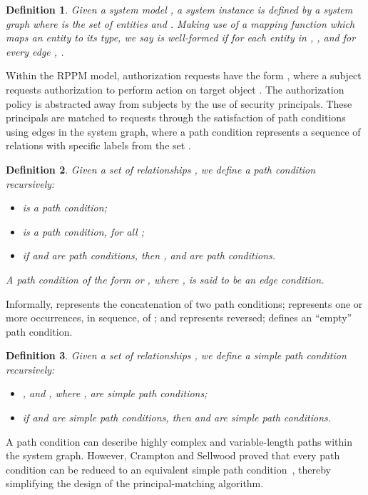 \documentclass{article}
\newtheorem{definition}{Definition}
\begin{document}
\begin{definition}
    Given a system model , a \emph{system instance} is defined by a \emph{system graph}  where  is the set of entities and .
    Making use of a mapping function  which maps an entity to its type, we say  is \emph{well-formed} if for each entity  in , , and for every edge , .
\end{definition}

Within the RPPM model, authorization requests have the form , where a subject  requests authorization to perform action  on target object .
The authorization policy is abstracted away from subjects by the use of security principals.
These principals are matched to requests through the satisfaction of path conditions using edges in the system graph, where a path condition  represents a sequence of relations with specific labels from the set .

\begin{definition}\label{def:path-condition}
   Given a set of relationships , we define a \emph{path condition} recursively:
    \begin{itemize}
        \item  is a path condition;
        \item  is a path condition, for all ;
        \item if  and  are path conditions, then ,  and  are path conditions.
    \end{itemize}
   A path condition of the form  or , where , is said to be an \emph{edge condition}.
\end{definition}

Informally,  represents the concatenation of two path conditions;  represents one or more occurrences, in sequence, of ; and  represents  reversed;  defines an ``empty'' path condition.

\begin{definition}
   Given a set of relationships , we define a \emph{simple path condition} recursively:
    \begin{itemize}
        \item ,  and , where , are simple path conditions;
        \item if  and  are simple path conditions, then  and  are simple path conditions.
    \end{itemize}
\end{definition}

A path condition can describe highly complex and variable-length paths within the system graph.
However, Crampton and Sellwood proved that every path condition can be reduced to an equivalent simple path condition~\cite[\S{2.2}]{CramptonS14}, thereby simplifying the design of the principal-matching algorithm.
\end{document}
